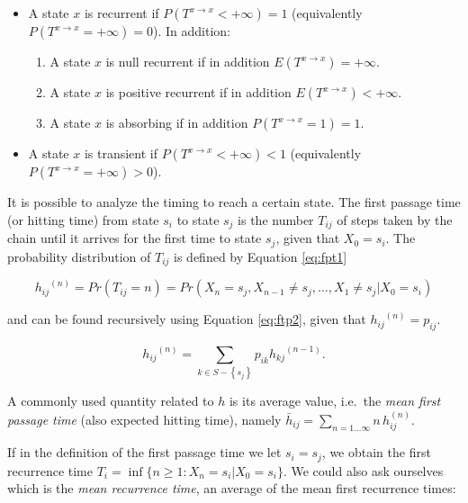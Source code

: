 \documentclass[
  nojss]{jss}
\providecommand{\tightlist}{%
  \setlength{\itemsep}{0pt}\setlength{\parskip}{0pt}}
\begin{document}
\begin{itemize}
\tightlist
\item
  A state \(x\) is recurrent if \(P(T^{x\rightarrow x}<+\infty)=1\) (equivalently \(P(T^{x\rightarrow x}=+\infty)=0\)). In addition:

  \begin{enumerate}
  \def\labelenumi{\arabic{enumi}.}
  \tightlist
  \item
    A state \(x\) is null recurrent if in addition \(E(T^{x\rightarrow x})=+\infty\).
  \item
    A state \(x\) is positive recurrent if in addition \(E(T^{x\rightarrow x})<+\infty\).
  \item
    A state \(x\) is absorbing if in addition \(P(T^{x\rightarrow x}=1)=1\).
  \end{enumerate}
\item
  A state \(x\) is transient if \(P(T^{x\rightarrow x}<+\infty)<1\) (equivalently \(P(T^{x\rightarrow x}=+\infty)>0\)).
\end{itemize}

It is possible to analyze the timing to reach a certain state. The first passage time (or hitting time) from state \(s_{i}\) to state \(s_{j}\) is the number \(T_{ij}\) of steps taken by the chain until it arrives for the first time to state \(s_{j}\), given that \(X_{0} = s_{i}\). The probability distribution of \(T_{ij}\) is defined by Equation \ref{eq:fpt1}

\begin{equation}
{h_{ij}}^{\left( n \right)} = Pr\left( {T_{ij} = n} \right) = Pr\left( X_n = s_j,X_{n - 1} \ne s_{j}, \ldots ,X_1 \ne s_j |X_0 = s_i \right)
\label{eq:fpt1}
\end{equation}

and can be found recursively using Equation \ref{eq:ftp2}, given that \({h_{ij}}^{\left( n \right)} = p_{ij}\).

\begin{equation}
{h_{ij}}^{\left( n \right)} = \sum\limits_{k \in S - \left\{ s_{j} \right\}}^{} {{p_{ik}}{h_{kj}}^{\left( {n - 1} \right)}}.
\label{eq:ftp2}
\end{equation}

A commonly used quantity related to \(h\) is its average value, i.e.~the \emph{mean first passage time} (also expected hitting time), namely \(\bar h_{ij}= \sum_{n=1\dots\infty} n \,h_{ij}^{(n)}\).

If in the definition of the first passage time we let \(s_{i}=s_{j}\), we obtain the first recurrence time \(T_{i}=\inf \{ n\geq1:X_{n}=s_{i}|X_{0}=s_{i} \}\). We could also ask ourselves which is the \emph{mean recurrence time}, an average of the mean first recurrence times:
\end{document}
